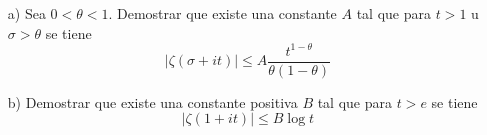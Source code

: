 \documentclass[twoside]{article}
\begin{document}
\begin{ejercicio}{7}
\begin{itemize}
\item[]
\item[a)] Sea $0<\theta<1$. Demostrar que existe una constante $A$ tal que para $t>1$ u $\sigma>\theta$ se tiene
$$
|\zeta(\sigma +it)|\leq A\frac{t^{1-\theta}}{\theta(1-\theta)}
$$
\item[b)] Demostrar que existe una constante positiva $B$ tal que para $t>e$ se tiene
$$
|\zeta(1+it)|\leq B\log t
$$
\end{itemize}
\end{ejercicio}
\end{document}

